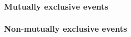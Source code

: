 \documentclass[handout]{beamer}
\begin{document}


   \begin{frame}
   \frametitle{Mutually exclusive events}
   \begin{center}
   \end{center}

   \end{frame}



   \begin{frame}
   \frametitle{Non-mutually exclusive events}
   \begin{center}
   \end{center}

   \end{frame}
\end{document}
